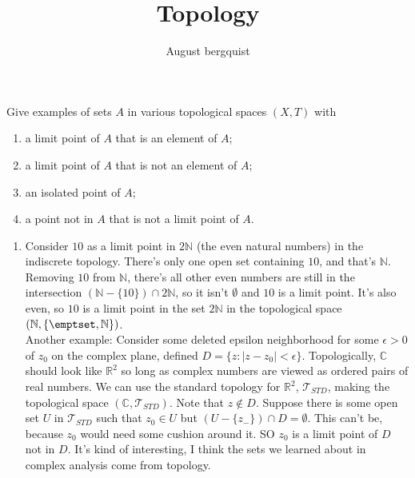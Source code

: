 \documentclass{article}
\title{Topology}
\author{August bergquist}
\theoremstyle{definition}
\newcommand{\standtop}{\mathcal{T}_{STD}}
\newcommand{\R}{\mathbb{R}}
\newcommand{\C}{\mathbb{C}}
\newcommand{\N}{\mathbb{N}}
\begin{document}
\maketitle

 Give examples of sets $A$ in various topological spaces $(X,T)$ with
\begin{enumerate}
    \item a limit point of $A$ that is an element of $A$;
    \item a limit point of $A$ that is not an element of $A$;
    \item an isolated point of $A$;
    \item a point not in $A$ that is not a limit point of $A$.
\end{enumerate}

\begin{enumerate}
    \item Consider $10$ as a limit point in $2\N$ (the even natural numbers) in the indiscrete topology. There's only one open set containing $10$, and that's $\N$. Removing $10$ from $\N$, there's all other even numbers are still in the intersection $(\N - \{10\})\cap 2\N$, so it isn't $\emptyset$ and $10$ is a limit point. It's also even, so $10$ is a limit point in the set $2\N$ in the topological space $(\N, \{\emptset, \N\})$.\\
    
    Another example: Consider some deleted epsilon neighborhood for some $\epsilon > 0$ of $z_0$ on the complex plane, defined $D = \{z:|z - z_0| < \epsilon\}.$ Topologically, $\C$ should look like $\R^2$ so long as complex numbers are viewed as ordered pairs of real numbers. We can use the standard topology for $\R^2 $, $\standtop$, making the topological space $(\C,\standtop)$. Note that $z\not\in D.$ Suppose there is some open set $U$ in $\standtop$ such that $z_0\in U$ but $(U- \{z_-\})\cap D = \emptyset$. This can't be, because $z_0$ would need some cushion around it. SO $z_0$ is a limit point of $D$ not in $D$. It's kind of interesting, I think the sets we learned about in complex analysis come from topology. 
    

\end{enumerate}
\end{document}

